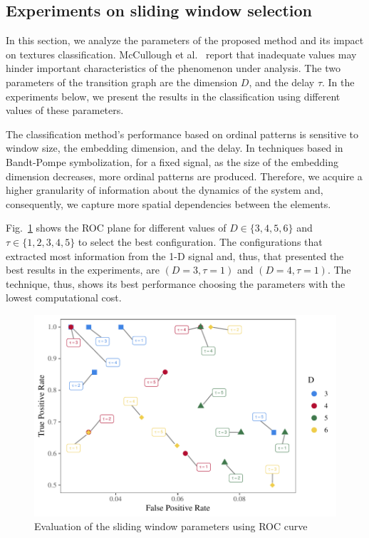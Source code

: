 \documentclass[journal]{IEEEtran}
\begin{document}
\subsection{Experiments on sliding window selection}

In this section, we analyze the parameters of the proposed method and its impact on textures classification.
McCullough et al.~\cite{McCullough2015lagged} report that inadequate values may hinder important characteristics of the phenomenon under analysis.
The two parameters of the transition graph are the dimension $D$, and the delay $\tau$.
In the experiments below, we present the results in the classification using different values of these parameters.

The classification method's performance based on ordinal patterns is sensitive to window size, the embedding dimension, and the delay.
In techniques based in Bandt-Pompe symbolization, for a fixed signal, as the size of the embedding dimension decreases, more ordinal patterns are produced.
Therefore, we acquire a higher granularity of information about the dynamics of the system and, consequently, we capture more spatial dependencies between the elements.

Fig.~\ref{fig:ROC} shows the ROC plane for different values of $D \in \{3, 4, 5, 6 \} $ and $\tau \in \{1, 2, 3, 4, 5 \}$ to select the best configuration.
The configurations that extracted most information from the \mbox{1-D} signal and, thus, that presented the best results in the experiments, are $(D = 3, \tau = 1)$ and $(D = 4, \tau = 1)$.
The technique, thus, shows its best performance choosing the parameters with the lowest computational cost.

\begin{figure}%
	\includegraphics[width=\columnwidth]{Figures/ROC.pdf}
	\caption{Evaluation of the sliding window parameters using ROC curve}
	\label{fig:ROC}
\end{figure} 
\end{document}
